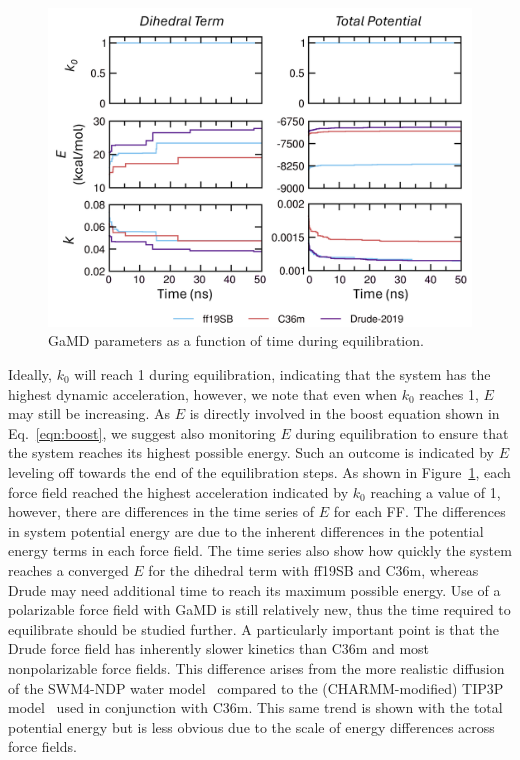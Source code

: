 \documentclass[9pt,tutorial]{livecoms}
\begin{document}
\begin{figure}[h] 
    \includegraphics[width=\columnwidth]{main_figs/equil_conv.png}
    \caption{GaMD parameters as a function of time during equilibration.}
    \label{fig:equil_conv_alad}
\end{figure}

Ideally, $k_{0}$ will reach 1 during equilibration, indicating that the system has the highest dynamic acceleration, however, we note that even when $k_{0}$ reaches 1, $E$ may still be increasing. As $E$ is directly involved in the boost equation shown in Eq.~\ref{eqn:boost}, we suggest also monitoring $E$ during equilibration to ensure that the system reaches its highest possible energy. Such an outcome is indicated by $E$ leveling off towards the end of the equilibration steps. As shown in Figure~\ref{fig:equil_conv_alad}, each force field reached the highest acceleration indicated by $k_{0}$ reaching a value of 1, however, there are differences in the time series of $E$ for each FF. The differences in system potential energy are due to the inherent differences in the  potential energy terms in each force field. The time series also show how quickly the system reaches a converged $E$ for the dihedral term with ff19SB and C36m, whereas Drude may need additional time to reach its maximum possible energy. Use of a polarizable force field with GaMD is still relatively new, thus the time required to equilibrate should be studied further. A particularly important point is that the Drude force field has inherently slower kinetics than C36m and most nonpolarizable force fields. This difference arises from the more realistic diffusion of the SWM4-NDP water model~\cite{lamoureux_swm4_2006} compared to the (CHARMM-modified) TIP3P model~\cite{jorgensen_tip3p_1983,durell_solv_1994,neria_activate_1996} used in conjunction with C36m. This same trend is shown with the total potential energy but is less obvious due to the scale of energy differences across force fields.
\end{document}
